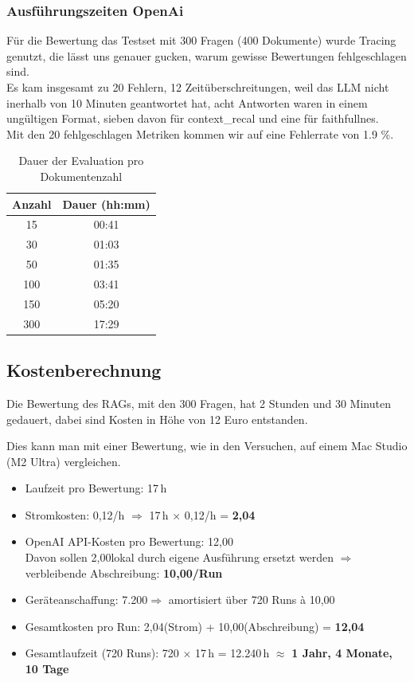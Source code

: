 \subsubsection{Ausführungszeiten OpenAi}
Für die Bewertung das Testset mit 300 Fragen (400 Dokumente) wurde Tracing genutzt, die lässt uns genauer gucken, warum gewisse Bewertungen fehlgeschlagen sind.\\ 
Es kam insgesamt zu 20 Fehlern, 12 Zeitüberschreitungen, weil das LLM nicht inerhalb von 10 Minuten geantwortet hat, acht Antworten waren in einem ungültigen Format, sieben davon für context\_recal und eine für faithfullnes.\\
Mit den 20 fehlgeschlagen Metriken kommen wir auf eine Fehlerrate von 1.9 \%.
\begin{table}[h!]
    \centering
    \begin{tabular}{|c|c|}
    \hline
    \textbf{Anzahl} & \textbf{Dauer (hh:mm)} \\
    \hline
    15   & 00:41 \\
    30   & 01:03 \\
    50   & 01:35 \\
    100  & 03:41 \\
    150  & 05:20 \\
    300  & 17:29 \\
    \hline
    \end{tabular}
    \caption{Dauer der Evaluation pro Dokumentenzahl}
\end{table}

\subsection{Kostenberechnung}

Die Bewertung des RAGs, mit den 300 Fragen, hat 2 Stunden und 30 Minuten gedauert, dabei sind Kosten in Höhe von 12 Euro entstanden.


Dies kann man mit einer Bewertung, wie in den Versuchen, auf einem Mac Studio (M2 Ultra) vergleichen.
\begin{itemize}
    \item Laufzeit pro Bewertung: 17\,h
    \item Stromkosten: 0{,}12\texteuro/h $\Rightarrow$ 17\,h $\times$ 0{,}12\texteuro/h = \textbf{2{,}04\texteuro}
    \item OpenAI API-Kosten pro Bewertung: 12{,}00\texteuro\\
          Davon sollen 2{,}00\texteuro lokal durch eigene Ausführung ersetzt werden $\Rightarrow$ verbleibende Abschreibung: \textbf{10{,}00\texteuro/Run}
    \item Geräteanschaffung: 7.200\texteuro $\Rightarrow$ amortisiert über 720 Runs à 10{,}00\texteuro
    \item Gesamtkosten pro Run: 2{,}04\texteuro (Strom) + 10{,}00\texteuro (Abschreibung) = \textbf{12{,}04\texteuro}
    \item Gesamtlaufzeit (720 Runs): 720 $\times$ 17\,h = 12.240\,h $\approx$ \textbf{1 Jahr, 4 Monate, 10 Tage}
\end{itemize}



